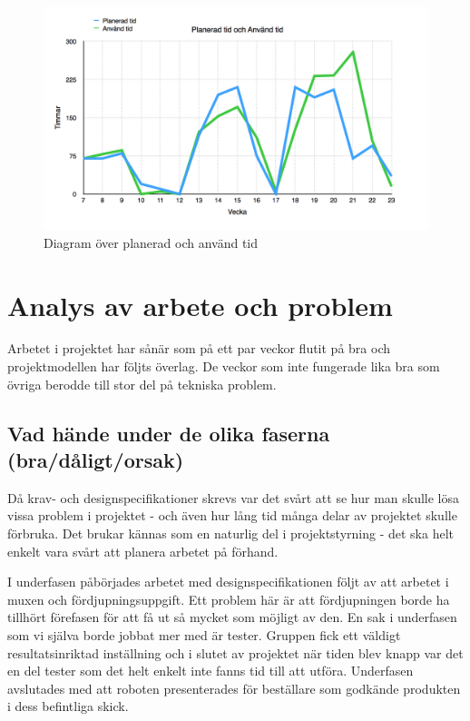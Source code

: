 \documentclass[a4paper,12pt,fleqn]{article}
\begin{document}
\begin{figure}[htp] %
  \begin{center}
  \includegraphics[keepaspectratio=true,scale=0.25]{tid.png}  %
  \end{center}
  \caption{Diagram över planerad och använd tid} %
  \label{fig:tid}
\end{figure}

\newpage

\section{Analys av arbete och problem}
Arbetet i projektet har sånär som på ett par veckor flutit på bra och projektmodellen har följts överlag. De veckor som inte fungerade lika bra som övriga berodde till stor del på tekniska problem.

\subsection{Vad hände under de olika faserna (bra/dåligt/orsak)}
Då krav- och designspecifikationer skrevs var det svårt att se hur man skulle lösa vissa problem i projektet - och även hur lång tid många delar av projektet skulle förbruka. Det brukar kännas som en naturlig del i projektstyrning - det ska helt enkelt vara svårt att planera arbetet på förhand. 

I underfasen påbörjades arbetet med designspecifikationen följt av att arbetet i muxen och fördjupningsuppgift. Ett problem här är att fördjupningen borde ha tillhört förefasen för att få ut så mycket som möjligt av den. En sak i underfasen som vi själva borde jobbat mer med är tester. Gruppen fick ett väldigt resultatsinriktad inställning och i slutet av projektet när tiden blev knapp var det en del tester som det helt enkelt inte fanns tid till att utföra. Underfasen avslutades med att roboten presenterades för beställare som godkände produkten i dess befintliga skick. 
\end{document}
